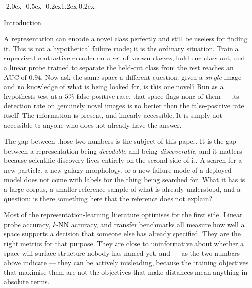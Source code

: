 \documentclass{article}
\makeatletter
\renewcommand\section{\@startsection{section}{1}{\z@}%
  {-2.0ex \@plus -0.5ex \@minus -0.2ex}{1.2ex \@plus 0.2ex}%
  {\large\bf\raggedright}}
\makeatother
\begin{document}
\section{Introduction}

A representation can encode a novel class perfectly and still be useless for
finding it. This is not a hypothetical failure mode; it is the ordinary
situation. Train a supervised contrastive encoder on a set of known classes,
hold one class out, and a linear probe trained to separate the held-out class
from the rest reaches an AUC of $0.94$. Now ask the same space a different
question: given a \emph{single} image and no knowledge of what is being looked
for, is this one novel? Run as a hypothesis test at a $5\%$ false-positive
rate, that space flags none of them --- its detection rate on genuinely novel
images is no better than the false-positive rate itself. The information is
present, and linearly accessible. It is simply not accessible to anyone who
does not already have the answer.

The gap between those two numbers is the subject of this paper. It is the gap
between a representation being \emph{decodable} and being
\emph{discoverable}, and it matters because scientific discovery lives
entirely on the second side of it. A search for a new particle, a new galaxy
morphology, or a new failure mode of a deployed model does not come with
labels for the thing being searched for. What it has is a large corpus, a
smaller reference sample of what is already understood, and a question: is
there something here that the reference does not explain?

Most of the representation-learning literature optimises for the first side.
Linear probe accuracy, $k$-NN accuracy, and transfer benchmarks all measure
how well a space supports a decision that someone else has already specified.
They are the right metrics for that purpose. They are close to uninformative
about whether a space will surface structure nobody has named yet, and --- as
the two numbers above indicate --- they can be actively misleading, because
the training objectives that maximise them are not the objectives that make
distances mean anything in absolute terms.
\end{document}
